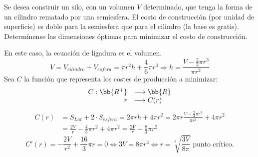 \begin{ejercicio}
    Se desea construir un silo, con un volumen $V$ determinado, que tenga la forma de un cilindro rematado por una semiesfera. El costo de construcción (por unidad de superficie) es doble para la semiesfera que para el cilindro (la base es gratis). Determínense las dimensiones óptimas para minimizar el costo de construcción.
    \begin{figure}[H]
        \centering
    \end{figure}
    En este caso, la ecuación de ligadura es el volumen.
    \begin{equation*}
        V = V_{cilindro} + V_{esfera} = \pi r^2h + \frac{4}{6}\pi r^3 \Longrightarrow h=\frac{V-\frac{2}{3}\pi r^3}{\pi r^2}
    \end{equation*}
    Sea $C$ la función que representa los costes de producción a minimizar:
    \begin{equation*}
        \begin{array}{rl}
            C:\bb{R^+} & \longrightarrow \bb{R}\\
                    r & \longmapsto C(r)
        \end{array}
    \end{equation*}
    \begin{equation*}\begin{split}
        C(r)&=S_{Lat} + 2\cdot S_{esfera} = 2\pi rh + 4\pi r^2 = 2\pi r\frac{V-\frac{2}{3}\pi r^3}{\pi r^2} + 4\pi r^2\\
        &= \frac{2V}{r} - \frac{4}{3}\pi r^2 + 4\pi r^2 = \frac{2V}{r} + \frac{8}{3}\pi r^2
    \end{split}\end{equation*}
    \begin{equation*}
        C'(r) = -\frac{2V}{r^2} + \frac{16}{3}\pi r = 0 \Longleftrightarrow 3V = 8\pi r^3 \Longleftrightarrow r=\sqrt[3]{\frac{3V}{8\pi}} \text{ punto crítico}.
    \end{equation*}


\end{ejercicio}
